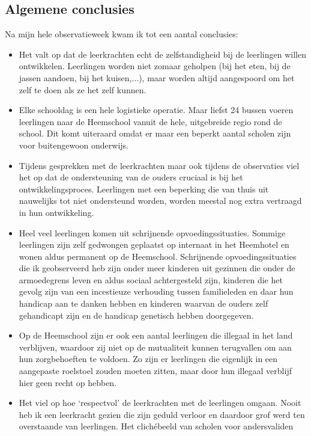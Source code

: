\documentclass[a4paper,11pt]{article}
\theoremstyle{definition}
\begin{document}
\begin{itemize}
\begin{itemize}
\subsection{Algemene conclusies}
Na mijn hele observatieweek kwam ik tot een aantal conclusies:
\begin{itemize}
  \item Het valt op dat de leerkrachten echt de zelfstandigheid bij de 
  leerlingen willen ontwikkelen. Leerlingen worden niet zomaar geholpen (bij het eten, bij de jassen aandoen, bij het kuisen,...), maar 
  worden altijd aangespoord om het zelf te doen als ze het zelf kunnen.
  \item Elke schooldag is een hele logistieke operatie. Maar liefst 24 bussen 
  voeren leerlingen naar de Heemschool vanuit de hele, uitgebreide regio rond de school. 
  Dit komt uiteraard omdat er maar een beperkt aantal scholen zijn voor 
  buitengewoon onderwijs. 
    \item Tijdens gesprekken met de leerkrachten maar ook tijdens de observaties 
  viel het op dat de ondersteuning van de ouders cruciaal is bij het 
  ontwikkelingsproces. Leerlingen met een beperking die van thuis uit nauwelijks 
  tot niet ondersteund worden, worden meestal nog extra vertraagd in hun 
  ontwikkeling.
  \item Heel veel leerlingen komen uit schrijnende opvoedingssituaties. Sommige 
  leerlingen zijn zelf gedwongen geplaatst op internaat in het Heemhotel en 
  wonen aldus permanent op de Heemschool. Schrijnende opvoedingssituaties die ik geobserveerd heb zijn 
  onder meer kinderen uit gezinnen die onder de armoedegrens leven en aldus sociaal 
  achtergesteld zijn, kinderen die het gevolg zijn van een incestieuze 
  verhouding tussen familieleden en daar hun handicap aan te danken hebben en 
  kinderen waarvan de ouders zelf gehandicapt zijn en de handicap genetisch hebben doorgegeven. 
  \item Op de Heemschool zijn er ook een aantal leerlingen die illegaal in het land verblijven, waardoor zij niet op de mutualiteit kunnen terugvallen om aan hun zorgbehoeften te voldoen.
  Zo zijn er leerlingen die eigenlijk in een aangepaste roelstoel zouden moeten zitten, 
  maar door hun illegaal verblijf hier geen recht op hebben.
  \item Het viel op hoe `respectvol' de leerkrachten met de leerlingen omgaan. 
  Nooit heb ik een leerkracht gezien die zijn geduld verloor en daardoor grof 
  werd ten overstaande van leerlingen. Het clichébeeld van scholen voor andersvaliden 

\end{itemize}
\end{itemize}
\end{itemize}
\end{document}
